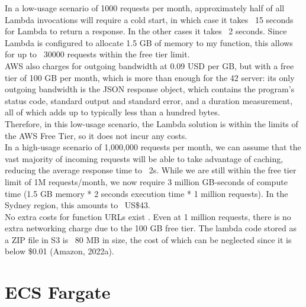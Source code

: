 In a low-usage scenario of 1000 requests per month, approximately half of all Lambda invocations will require a cold start, in which case it takes ~15 seconds for Lambda to return a response. In the other cases it takes ~2 seconds. Since Lambda is configured to allocate 1.5 GB of memory to my function, this allows for up to ~30000 requests within the free tier limit.
\\[12pt]
AWS also charges for outgoing bandwidth at 0.09 USD per GB, but with a free tier of 100 GB per month, which is more than enough for the 42 server: its only outgoing bandwidth is the JSON response object, which contains the program's status code, standard output and standard error, and a duration measurement, all of which adds up to typically less than a hundred bytes.
\\[12pt]
Therefore, in this low-usage scenario, the Lambda solution is within the limits of the AWS Free Tier, so it does not incur any costs.
\\[12pt]
In a high-usage scenario of 1,000,000 requests per month, we can assume that the vast majority of incoming requests will be able to take advantage of caching, reducing the average response time to ~2s. While we are still within the free tier limit of 1M requests/month, we now require 3 million GB-seconds of compute time (1.5 GB memory * 2 seconds execution time * 1 million requests). In the Sydney region, this amounts to ~US\$43.
\\[12pt]
No extra costs for function URLs exist \cite{casalboni-2022}. Even at 1 million requests, there is no extra networking charge due to the 100 GB free tier. The lambda code stored as a ZIP file in S3 is ~80 MB in size, the cost of which can be neglected since it is below \$0.01 (Amazon, 2022a).

\section{ECS Fargate}

